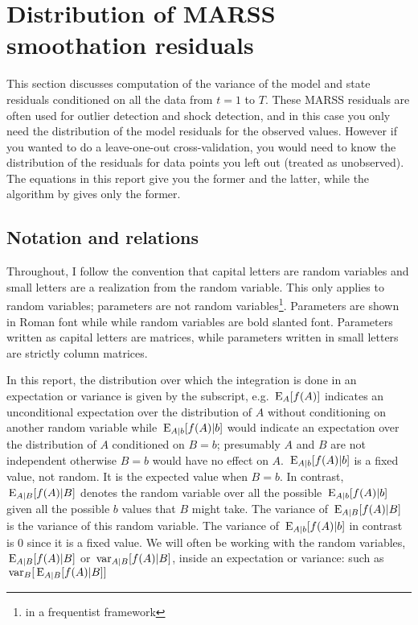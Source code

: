 \documentclass[]{article}
\def\E{\,\textup{\textrm{E}}}
\def\var{\,\textup{\textrm{var}}}
\begin{document}
\section{Distribution of MARSS smoothation residuals}\label{sec:smoothations}

This section discusses computation of the variance of the model and state residuals conditioned on all the data from $t=1$ to $T$.  These MARSS residuals are often used for outlier detection and shock detection, and in this case you only need the distribution of the model residuals for the observed values.  However if you wanted to do a leave-one-out cross-validation, you would need to know the distribution of the residuals for data points you left out (treated as unobserved).  The equations in this report give you the former and the latter, while the algorithm by \citet{Harveyetal1998} gives only the former.

\subsection{Notation and relations}

Throughout, I follow the convention that capital letters are random variables and small letters are a realization from the random variable.  This only applies to random variables; parameters are not random variables\footnote{in a frequentist framework}. Parameters are shown in Roman font while while random variables are bold slanted font. Parameters written as capital letters are matrices, while parameters written in small letters are strictly column matrices. 

In this report, the distribution over which the integration is done in an expectation or variance  is given by the subscript, e.g. $\E_A[f(A)]$ indicates an unconditional expectation over the distribution of $A$ without conditioning on another random variable while $\E_{A|b}[f(A)|b]$ would indicate an expectation over the distribution of $A$ conditioned on $B=b$; presumably $A$ and $B$ are not independent otherwise $B=b$ would have no effect on $A$. $\E_{A|b}[f(A)|b]$ is a fixed value, not random. It is the expected value when $B=b$. In contrast, $\E_{A|B}[f(A)|B]$ denotes the random variable over all the possible $\E_{A|b}[f(A)|b]$ given all the possible $b$ values that $B$ might take. The variance of $\E_{A|B}[f(A)|B]$ is the variance of this random variable. The variance of $\E_{A|b}[f(A)|b]$ in contrast is 0 since it is a fixed value.  We will often be working with the random variables, $\E_{A|B}[f(A)|B]$ or $\var_{A|B}[f(A)|B]$, inside an expectation or variance: such as $\var_B[\E_{A|B}[f(A)|B]]$
\end{document}
